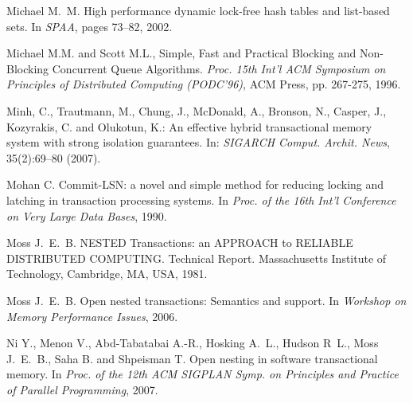 \begin{thebibliography}{99}
{
Michael M.~M.
\newblock High performance dynamic lock-free hash tables and list-based sets.
\newblock In {\em SPAA}, pages 73--82, 2002.





Michael M.M.  and Scott M.L., 
Simple, Fast and Practical Blocking and Non-Blocking Concurrent
Queue Algorithms.
{\it  Proc. 15th  Int'l  ACM Symposium on Principles of  Distributed 
Computing (PODC'96)},  ACM Press, pp. 267-275,  1996. 



Minh, C., Trautmann, M., Chung, J., McDonald, A., Bronson, N., Casper, J., Kozyrakis, C. and Olukotun, K.:
An effective hybrid transactional memory system with strong isolation guarantees.
In: {\it SIGARCH Comput. Archit. News}, 35(2):69--80 (2007).





Mohan C.
\newblock Commit-{LSN}: a novel and simple method for reducing locking and
  latching in transaction processing systems.
\newblock In {\em Proc. of the 16th Int'l Conference on Very Large Data Bases},
  1990.




Moss J.~E.~B.
\newblock NESTED Transactions: an APPROACH to RELIABLE DISTRIBUTED COMPUTING.
\newblock Technical Report. Massachusetts Institute of Technology, Cambridge, MA, USA, 1981.

Moss J.~E.~B.
\newblock Open nested transactions: Semantics and support.
\newblock In {\em Workshop on Memory Performance Issues}, 2006.





Ni Y., Menon V., Abd-Tabatabai A.-R., Hosking A.~L.,
  Hudson R~L., Moss J.~E.~B., Saha B. and Shpeisman T.
\newblock Open nesting in software transactional memory.
\newblock In {\em Proc. of the 12th ACM SIGPLAN Symp. on Principles and
  Practice of Parallel Programming}, 2007.


}
\end{thebibliography}

